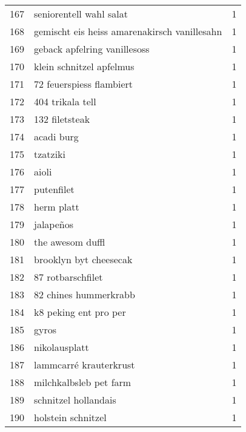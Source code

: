 \begin{tabular}{llr}
167 &                            seniorentell wahl salat &      1 \\
168 &       gemischt eis heiss amarenakirsch vanillesahn &      1 \\
169 &                       geback apfelring vanillesoss &      1 \\
170 &                           klein schnitzel apfelmus &      1 \\
171 &                           72 feuerspiess flambiert &      1 \\
172 &                                   404 trikala tell &      1 \\
173 &                                     132 filetsteak &      1 \\
174 &                                         acadi burg &      1 \\
175 &                                           tzatziki &      1 \\
176 &                                              aioli &      1 \\
177 &                                         putenfilet &      1 \\
178 &                                         herm platt &      1 \\
179 &                                          jalapeños &      1 \\
180 &                                   the awesom duffl &      1 \\
181 &                             brooklyn byt cheesecak &      1 \\
182 &                                  87 rotbarschfilet &      1 \\
183 &                              82 chines hummerkrabb &      1 \\
184 &                              k8 peking ent pro per &      1 \\
185 &                                              gyros &      1 \\
186 &                                      nikolausplatt &      1 \\
187 &                             lammcarré krauterkrust &      1 \\
188 &                             milchkalbsleb pet farm &      1 \\
189 &                               schnitzel hollandais &      1 \\
190 &                                 holstein schnitzel &      1 \\

\end{tabular}
